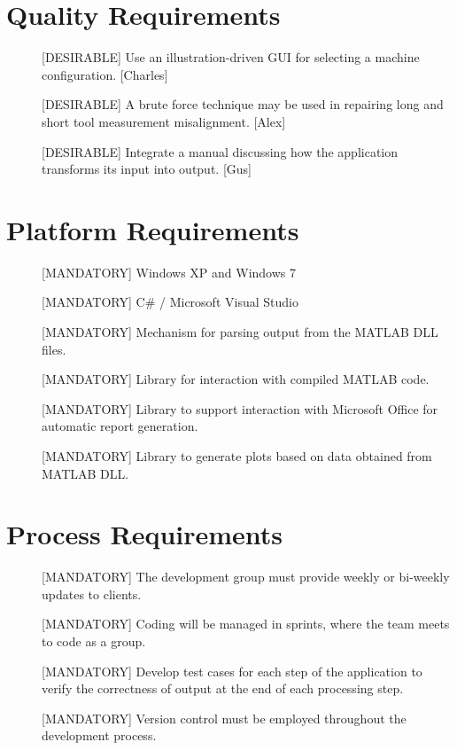 \documentclass[pdftex,10pt,a4paper]{article}
\begin{document}
\section*{Quality Requirements}
\begin{description}
\item[] [DESIRABLE] Use an illustration-driven GUI for selecting a machine configuration. [Charles]
\item[] [DESIRABLE] A brute force technique may be used in repairing long and short tool measurement misalignment. [Alex]
\item[] [DESIRABLE] Integrate a manual discussing how the application transforms its input into output. [Gus]
\end{description}

\section*{Platform Requirements}
\begin{description}
\item[] [MANDATORY] Windows XP and Windows 7
\item[] [MANDATORY] C\# / Microsoft Visual Studio
\item[] [MANDATORY] Mechanism for parsing output from the MATLAB DLL files.
\item[] [MANDATORY] Library for interaction with compiled MATLAB code.
\item[] [MANDATORY] Library to support interaction with Microsoft Office for automatic report generation.
\item[] [MANDATORY] Library to generate plots based on data obtained from MATLAB DLL.
\end{description}

\section*{Process Requirements}
\begin{description}
\item[] [MANDATORY] The development group must provide weekly or bi-weekly updates to clients.
\item[] [MANDATORY] Coding will be managed in sprints, where the team meets to code as a group.
\item[] [MANDATORY] Develop test cases for each step of the application to verify the correctness of output at the end of each processing step. 
\item[] [MANDATORY] Version control must be employed throughout the development process. 

\end{description}
\end{document}
